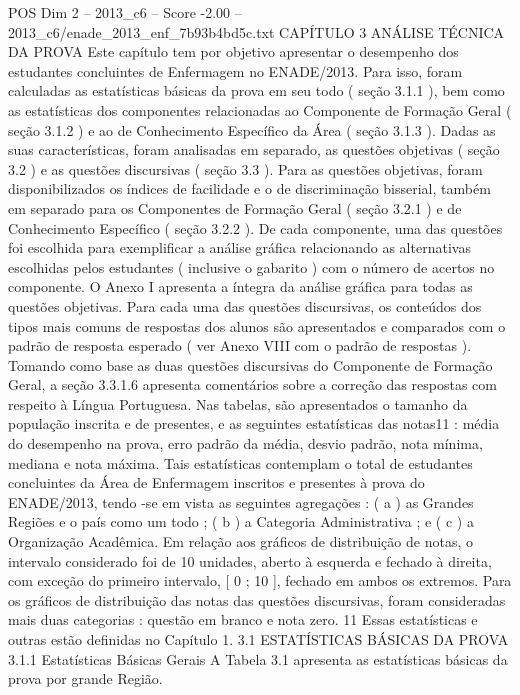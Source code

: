 \begin{textsample}{POS Dim 2 – 2013\_c6 – Score -2.00 – 2013\_c6/enade\_2013\_enf\_7b93b4bd5c.txt}  \label{ex:f2_pos_379}
CAPÍTULO 3 ANÁLISE TÉCNICA DA PROVA Este capítulo tem por objetivo apresentar o desempenho dos estudantes concluintes de Enfermagem no ENADE/2013.
Para isso, foram calculadas as estatísticas básicas da prova em seu todo ( seção 3.1.1 ), bem como as estatísticas dos componentes relacionadas ao Componente de Formação Geral ( seção 3.1.2 ) e ao de Conhecimento Específico da Área ( seção 3.1.3 ).
Dadas as suas características, foram analisadas em separado, as questões objetivas ( seção 3.2 ) e as questões discursivas ( seção 3.3 ).
Para as questões objetivas, foram disponibilizados os índices de facilidade e o de discriminação bisserial, também em separado para os Componentes de Formação Geral ( seção 3.2.1 ) e de Conhecimento Específico ( seção 3.2.2 ).
De cada componente, uma das questões foi escolhida para exemplificar a análise gráfica relacionando as alternativas escolhidas pelos estudantes ( inclusive o gabarito ) com o número de acertos no componente.
O Anexo I apresenta a íntegra da análise gráfica para todas as questões objetivas.
Para cada uma das questões discursivas, os conteúdos dos tipos mais comuns de respostas dos alunos são apresentados e comparados com o padrão de resposta esperado ( ver Anexo VIII com o padrão de respostas ).
Tomando como base as duas questões discursivas do Componente de Formação Geral, a seção 3.3.1.6 apresenta comentários sobre a correção das respostas com respeito à Língua Portuguesa.
Nas tabelas, são apresentados o tamanho da população inscrita e de presentes, e as seguintes estatísticas das notas11 : média do desempenho na prova, erro padrão da média, desvio padrão, nota mínima, mediana e nota máxima.
Tais estatísticas contemplam o total de estudantes concluintes da Área de Enfermagem inscritos e presentes à prova do ENADE/2013, tendo -se em vista as seguintes agregações : ( a ) as Grandes Regiões e o país como um todo ; ( b ) a Categoria Administrativa ; e ( c ) a Organização Acadêmica.
Em relação aos gráficos de distribuição de notas, o intervalo considerado foi de 10 unidades, aberto à esquerda e fechado à direita, com exceção do primeiro intervalo, [ 0 ; 10 ], fechado em ambos os extremos.
Para os gráficos de distribuição das notas das questões discursivas, foram consideradas mais duas categorias : questão em branco e nota zero. 11 Essas estatísticas e outras estão definidas no Capítulo 1. 3.1 ESTATÍSTICAS BÁSICAS DA PROVA 3.1.1 Estatísticas Básicas Gerais A Tabela 3.1 apresenta as estatísticas básicas da prova por grande Região.

\end{textsample}

